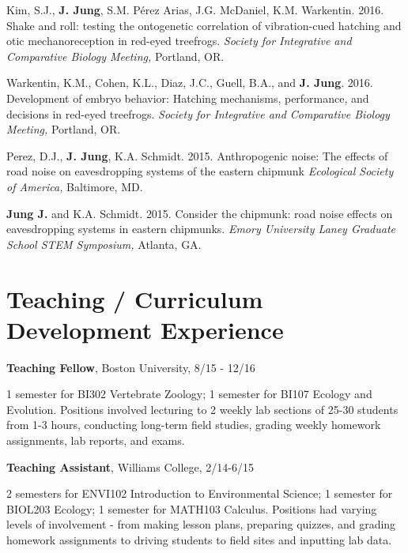 \documentclass[margin,line]{res}
\begin{document}
\begin{resume}
\vspace{-.25cm}
Kim, S.J., {\bf J. Jung}, S.M. Pérez Arias, J.G. McDaniel, K.M. Warkentin. {2016.} {Shake and roll: testing the ontogenetic correlation of vibration-cued hatching and otic mechanoreception in red-eyed treefrogs.} {\it Society for Integrative and Comparative Biology Meeting,} {Portland, OR.}

\vspace{-.25cm}
Warkentin, K.M., Cohen, K.L., Diaz, J.C., Guell, B.A., and {\bf J. Jung}. {2016.} {Development of embryo behavior: Hatching mechanisms, performance, and decisions in red-eyed treefrogs.} {\it Society for Integrative and Comparative Biology Meeting,} {Portland, OR.}

\vspace{-.25cm}
Perez, D.J., {\bf J. Jung}, K.A. Schmidt. {2015.} {Anthropogenic noise: The effects of road noise on eavesdropping systems of the eastern chipmunk} {\it Ecological Society of America,} {Baltimore, MD.}

\vspace{-.25cm}
{\bf Jung J.} and K.A. Schmidt. {2015.} {Consider the chipmunk: road noise effects on eavesdropping systems in eastern chipmunks.} {\it Emory University Laney Graduate School STEM Symposium,} {Atlanta, GA. }

\section{\sc Teaching / Curriculum Development Experience}
{\bf Teaching Fellow},  Boston University, 8/15 - 12/16 

\vspace{-.43cm}
{1 semester for BI302 Vertebrate Zoology; 1 semester for BI107 Ecology and Evolution. Positions involved lecturing to 2 weekly lab sections of 25-30 students from 1-3 hours, conducting long-term field studies, grading weekly homework assignments, lab reports, and exams. }

\vspace{-.1cm}
{\bf Teaching Assistant},  Williams College, 2/14-6/15 

\vspace{-.43cm}
{2 semesters for ENVI102 Introduction to Environmental Science; 1 semester for BIOL203 Ecology; 1 semester for MATH103 Calculus. Positions had varying levels of involvement - from making lesson plans, preparing quizzes, and grading homework assignments to driving students to field sites and inputting lab data.}


\end{resume}
\end{document}
